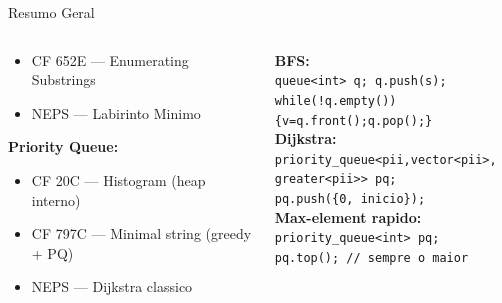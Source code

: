 \documentclass[aspectratio=169,11pt]{beamer}
\begin{document}
\begin{frame}[shrink=5]{Resumo Geral}
\begin{columns}[t]
\begin{tcolorbox}[caixaVerde,title={Problemas para Praticar}]
\begin{itemize}
          \item CF 652E --- Enumerating Substrings
          \item NEPS --- Labirinto Minimo
        \end{itemize}
        \textbf{Priority Queue:}
        \begin{itemize}
          \item CF 20C --- Histogram (heap interno)
          \item CF 797C --- Minimal string (greedy + PQ)
          \item NEPS --- Dijkstra classico
        \end{itemize}
      \end{tcolorbox}
      \begin{tcolorbox}[caixaAzul,title={Template Mental}]
        \small
        \textbf{BFS:}\\
        \texttt{queue<int> q; q.push(s);}\\
        \texttt{while(!q.empty())\{v=q.front();q.pop();\}}\\[6pt]
        \textbf{Dijkstra:}\\
        \texttt{priority\_queue<pii,vector<pii>,}\\
        \texttt{greater<pii>> pq;}\\
        \texttt{pq.push(\{0, inicio\});}\\[6pt]
        \textbf{Max-element rapido:}\\
        \texttt{priority\_queue<int> pq;}\\
        \texttt{pq.top(); // sempre o maior}
      \end{tcolorbox}
  \end{columns}
\end{frame}
\end{document}
